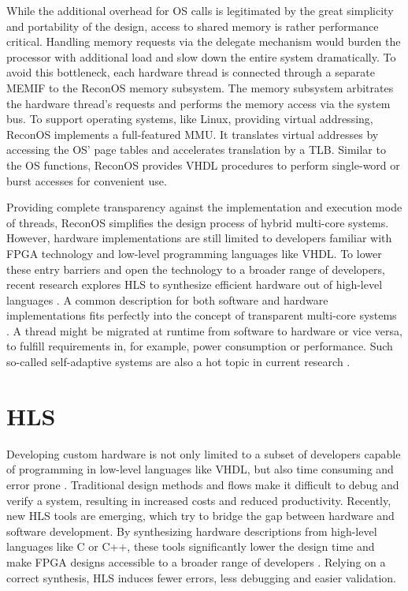 While the additional overhead for \ac{OS} calls is legitimated by the great
simplicity and portability of the design, access to shared memory is rather
performance critical. Handling memory requests via the delegate mechanism
would burden the processor with additional load and slow down the entire
system dramatically. To avoid this bottleneck, each hardware thread is
connected through a separate \ac{MEMIF} to the ReconOS memory subsystem. The
memory subsystem arbitrates the hardware thread's requests and performs the
memory access via the system bus. To support operating systems, like Linux,
providing virtual addressing, ReconOS implements a full-featured \ac{MMU}. It
translates virtual addresses by accessing the \ac{OS}' page tables and
accelerates translation by a \ac{TLB}. Similar to the \ac{OS} functions,
ReconOS provides \ac{VHDL} procedures to perform single-word or burst accesses
for convenient use.

Providing complete transparency against the implementation and execution mode
of threads, ReconOS simplifies the design process of hybrid multi-core
systems. However, hardware implementations are still limited to developers
familiar with \ac{FPGA} technology and low-level programming languages like
\ac{VHDL}. To lower these entry barriers and open the technology to a broader
range of developers, recent research explores \ac{HLS} to synthesize efficient
hardware out of high-level languages \citep{SWL13}. A common description for
both software and hardware implementations fits perfectly into the concept of
transparent multi-core systems \citep{CBN11}. A thread might be migrated at
runtime from software to hardware or vice versa, to fulfill requirements in,
for example, power consumption or performance. Such so-called self-adaptive
systems are also a hot topic in current research \citep{AHL14,HLP09}.

\section{\acl{HLS}}
Developing custom hardware is not only limited to a subset of developers
capable of programming in low-level languages like \ac{VHDL}, but also time
consuming and error prone \citep{SWL13}. Traditional design methods and flows
make it difficult to debug and verify a system, resulting in increased costs
and reduced productivity. Recently, new \ac{HLS} tools are emerging, which try
to bridge the gap between hardware and software development. By synthesizing
hardware descriptions from high-level languages like C or C++, these tools
significantly lower the design time and make \ac{FPGA} designs accessible to a
broader range of developers \citep{PeTh05}. Relying on a correct synthesis,
\ac{HLS} induces fewer errors, less debugging and easier validation.

